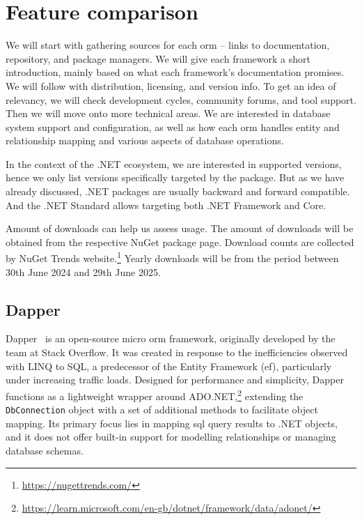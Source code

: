 \section{Feature comparison}
We will start with gathering sources for each \acrshort{orm} -- links to documentation, repository, and package managers. We will give each framework a short introduction, mainly based on what each framework's documentation promises. We will follow with distribution, licensing, and version info. To get an idea of relevancy, we will check development cycles, community forums, and tool support. Then we will move onto more technical areas. We are interested in database system support and configuration, as well as how each \acrshort{orm} handles entity and relationship mapping and various aspects of database operations.

In the context of the .NET ecosystem, we are interested in supported versions, hence we only list versions specifically targeted by the package. But as we have already discussed, .NET packages are usually backward and forward compatible. And the .NET Standard allows targeting both .NET Framework and Core.

Amount of downloads can help us assess usage. The amount of downloads will be obtained from the respective NuGet package page. Download counts are collected by NuGet Trends website.\footnote{\url{https://nugettrends.com/}} Yearly downloads will be from the period between 30th June 2024 and 29th June 2025.

\subsection{Dapper}
\label{sec:feat_dapper}

Dapper~\cite{Dapper,DapperRepo} is an open-source micro \acrshort{orm} framework, originally developed by the team at Stack Overflow. It was created in response to the inefficiencies observed with LINQ to SQL, a predecessor of the Entity Framework (\acrshort{ef}), particularly under increasing traffic loads. Designed for performance and simplicity, Dapper functions as a lightweight wrapper around ADO.NET,\footnote{\url{https://learn.microsoft.com/en-gb/dotnet/framework/data/adonet/}} extending the \texttt{DbConnection} object with a set of additional methods to facilitate object mapping. Its primary focus lies in mapping \acrshort{sql} query results to .NET objects, and it does not offer built-in support for modelling relationships or managing database schemas.

